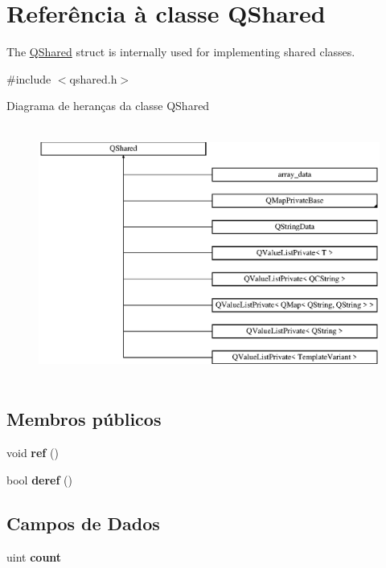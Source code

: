 \hypertarget{struct_q_shared}{\section{Referência à classe Q\-Shared}
\label{struct_q_shared}
}


The \hyperlink{struct_q_shared}{Q\-Shared} struct is internally used for implementing shared classes.  




{\ttfamily \#include $<$qshared.\-h$>$}

Diagrama de heranças da classe Q\-Shared\begin{figure}[H]
\begin{center}
\leavevmode
\includegraphics[height=8.400000cm]{struct_q_shared}
\end{center}
\end{figure}
\subsection*{Membros públicos}
\begin{DoxyCompactItemize}
\item 
\hypertarget{struct_q_shared_ae84429cc5d55e687f3abbd5c0bfe7430}{void {\bfseries ref} ()}\label{struct_q_shared_ae84429cc5d55e687f3abbd5c0bfe7430}

\item 
\hypertarget{struct_q_shared_ade4d3f74b88a085b2e905c3a108c57f6}{bool {\bfseries deref} ()}\label{struct_q_shared_ade4d3f74b88a085b2e905c3a108c57f6}

\end{DoxyCompactItemize}
\subsection*{Campos de Dados}
\begin{DoxyCompactItemize}
\item 
\hypertarget{struct_q_shared_ab77ade2208ba49f6e2b934ef32622c48}{uint {\bfseries count}}\label{struct_q_shared_ab77ade2208ba49f6e2b934ef32622c48}

\end{DoxyCompactItemize}


